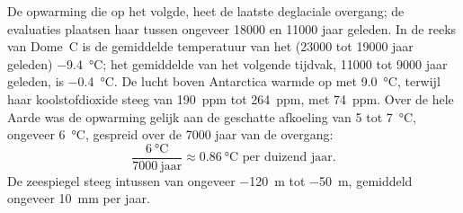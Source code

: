\begin{example}
De opwarming die op het  volgde, heet de laatste
deglaciale overgang; de evaluaties plaatsen haar tussen ongeveer \num{18000} en
\num{11000} jaar geleden. In de reeks van Dome~C is de gemiddelde temperatuur van het
 (\num{23000} tot \num{19000} jaar geleden)
\qty{-9.4}{\degreeCelsius}; het gemiddelde van het volgende tijdvak, \num{11000} tot
\num{9000} jaar geleden, is \qty{-0.4}{\degreeCelsius}. De lucht boven Antarctica
warmde op met \qty{9.0}{\degreeCelsius}, terwijl haar koolstofdioxide steeg van
\qty{190}{ppm} tot \qty{264}{ppm}, met \qty{74}{ppm}. Over de hele Aarde
was de opwarming gelijk aan de geschatte afkoeling van 5 tot \qty{7}{\degreeCelsius}, ongeveer
\qty{6}{\degreeCelsius}, gespreid over de \num{7000} jaar van de overgang:
\[
  \frac{\qty{6}{\degreeCelsius}}{\num{7000}\ \text{jaar}} \approx
  \qty{0.86}{\degreeCelsius} \text{ per duizend jaar.}
\]
De zeespiegel steeg intussen van ongeveer \qty{-120}{m} tot \qty{-50}{m}, gemiddeld ongeveer
\qty{10}{mm} per jaar.
\end{example}

